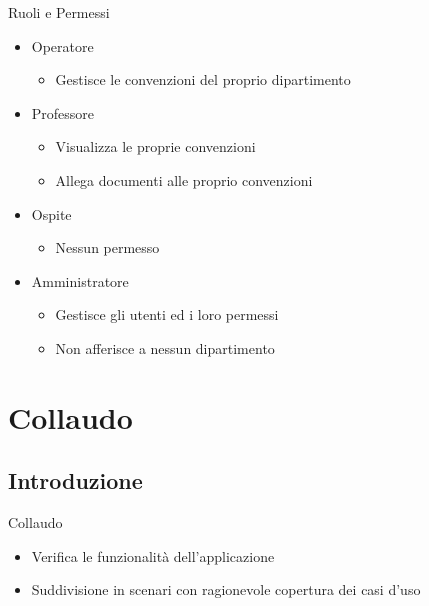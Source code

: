 \begin{frame}{Ruoli e Permessi}
\begin{itemize}
	
\item Operatore
	\begin{itemize}
	\item Gestisce le convenzioni del proprio dipartimento
	\end{itemize}

\vspace{0.8em}
\item Professore
	\begin{itemize}
	\item Visualizza le proprie convenzioni
	\item Allega documenti alle proprio convenzioni
	\end{itemize}

\vspace{0.8em}
\item Ospite
	\begin{itemize}
	\item Nessun permesso
	\end{itemize}

\vspace{0.8em}
\item Amministratore
	\begin{itemize}
	\item Gestisce gli utenti ed i loro permessi
	\item Non afferisce a nessun dipartimento
	\end{itemize}
\end{itemize}
\end{frame}

\section{Collaudo}
\subsection{Introduzione}
\begin{frame}{Collaudo}
\begin{itemize}
\item Verifica le funzionalità dell'applicazione
\vspace{0.8em}
\item Suddivisione in scenari con ragionevole copertura\newline
dei casi d'uso
\end{itemize}

\end{frame}

